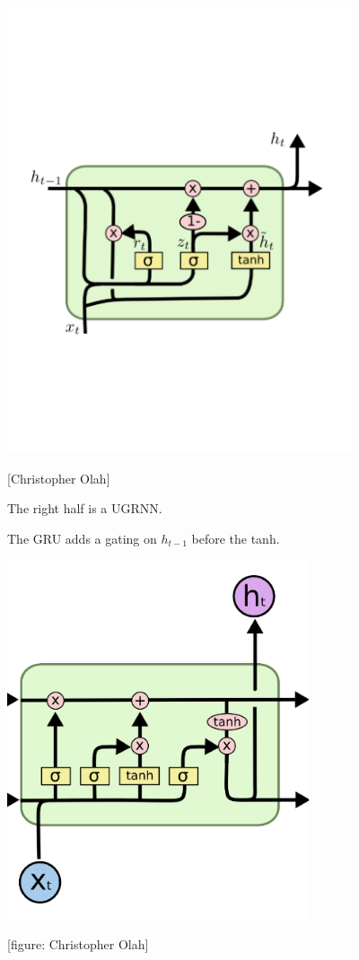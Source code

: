 {

\centerline{\includegraphics[width=4.0in]{../images/GRU}}
\centerline{{\huge [Christopher Olah]}}

\vfill
The right half is a UGRNN.

\vfill
The GRU adds a gating on $h_{t-1}$ before the tanh.

\centerline{\includegraphics[width=3.5in]{../images/LSTM}}
\centerline{{\large [figure: Christopher Olah]}}

}
